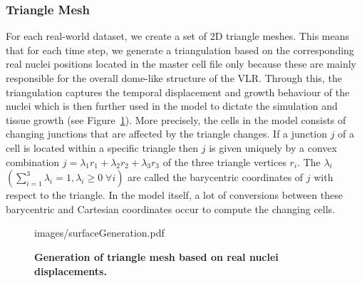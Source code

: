 \documentclass[11pt,a4paper, draft]{article}
\begin{document}
\subsubsection{Triangle Mesh}
\noindent
For each real-world dataset, we create a set of 2D triangle meshes. This means that for each time step, we generate a triangulation based on the corresponding real nuclei positions located in the master cell file only because these are mainly responsible for the overall dome-like structure of the VLR. Through this, the triangulation captures the temporal displacement and growth behaviour of the nuclei which is then further used in the model to dictate the simulation and tissue growth (see Figure~\ref{fig:surfaceGeneration}). More precisely, the cells in the model consists of changing junctions that are affected by the triangle changes. If a junction $j$ of a cell is located within a specific triangle then $j$ is given uniquely by a convex combination $j = \lambda_1 r_1 + \lambda_2 r_2 + \lambda_3 r_3$ of the three triangle vertices $r_i$. The $\lambda_i$ $\left( \sum_{i=1}^{3} \lambda_i = 1, \lambda_i \geq 0 \; \forall i \right)$ are called the barycentric coordinates of $j$ with respect to the triangle. In the model itself, a lot of conversions between these barycentric and Cartesian coordinates occur to compute the changing cells.
%
\begin{figure}[htbp]
	\begin{center}
		\begin{overpic}[width=1.\linewidth]{images/surfaceGeneration.pdf}
		\end{overpic}
\caption[Generation of triangle mesh based on real nuclei displacements.]
{
{\bf Generation of triangle mesh based on real nuclei displacements.}
}
	\label{fig:surfaceGeneration}
	\end{center}
\end{figure}
%
\end{document}
